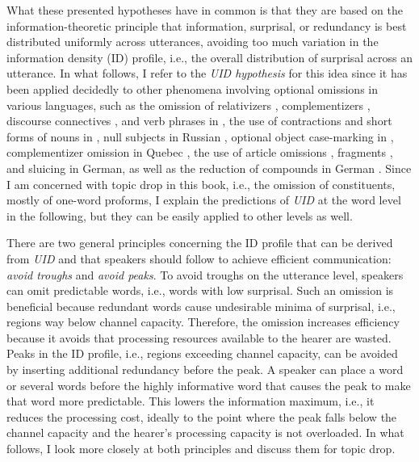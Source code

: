 What these presented hypotheses have in common is that they are based on the information-theoretic principle that information, surprisal, or redundancy  is best distributed uniformly across utterances, avoiding too much variation in the information density (ID) profile, i.e., the overall distribution of surprisal across an utterance.
In what follows, I refer to the \textit{UID hypothesis} for this idea since it has been applied decidedly to other phenomena involving optional omissions in various languages, such as the omission of relativizers \citep{levy.jaeger2007}, complementizers  \citep{jaeger2010, kaatari2016}, discourse connectives \citep{asr.demberg2015,yung.etal2016}, and verb phrases  \citep{schafer.etal2021} in , the use of contractions \citep{frank.jaeger2008} and short forms of nouns \citep{mahowald.etal2013} in , null subjects  in Russian  \citep{kravtchenko2014}, optional object case-marking in  \citep{kurumada.jaeger2015}, complementizer omission  in Quebec  \citep{liang.etal2021}, the use of article omissions  \citep{lemke.etal2017}, fragments  \citep{lemke2021}, and sluicing  \citep{lemke.etal2022} in German, as well as the reduction of compounds in German \citep{zarcone.demberg2021}.
Since I am concerned with topic drop in this book, i.e., the omission of constituents, mostly of one-word proforms, I explain the predictions of \textit{UID} at the word level in the following, but they can be easily applied to other levels as well.

There are two general principles concerning the ID profile that can be derived from \textit{UID} and that speakers should follow to achieve efficient communication: \textit{avoid troughs} and \textit{avoid peaks}.
To avoid troughs on the utterance level, speakers can omit predictable  words, i.e., words with low surprisal.
Such an omission is beneficial because redundant words cause undesirable minima of surprisal, i.e., regions way below channel capacity.  
Therefore, the omission increases efficiency because it avoids that processing resources available to the hearer are wasted.
Peaks in the ID profile, i.e., regions exceeding channel capacity,  can be avoided by inserting additional redundancy before the peak.
A speaker can place a word or several words before the highly informative word that causes the peak to make that word more predictable. 
This lowers the information maximum, i.e., it reduces the processing cost, ideally to the point where the peak falls below the channel capacity  and the hearer's processing capacity  is not overloaded.
In what follows, I look more closely at both principles and discuss them for topic drop.

